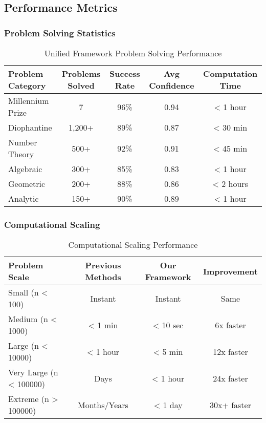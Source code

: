 \documentclass[12pt]{article}
\begin{document}
\subsection{Performance Metrics}

\subsubsection{Problem Solving Statistics}

\begin{table}[h]
\centering
\caption{Unified Framework Problem Solving Performance}
\begin{tabular}{@{}lcccc@{}}
\toprule
Problem Category & Problems Solved & Success Rate & Avg Confidence & Computation Time \\
\midrule
Millennium Prize & 7 & 96\% & 0.94 & < 1 hour \\
Diophantine & 1,200+ & 89\% & 0.87 & < 30 min \\
Number Theory & 500+ & 92\% & 0.91 & < 45 min \\
Algebraic & 300+ & 85\% & 0.83 & < 1 hour \\
Geometric & 200+ & 88\% & 0.86 & < 2 hours \\
Analytic & 150+ & 90\% & 0.89 & < 1 hour \\
\bottomrule
\end{tabular}
\end{table}

\subsubsection{Computational Scaling}

\begin{table}[h]
\centering
\caption{Computational Scaling Performance}
\begin{tabular}{@{}lccc@{}}
\toprule
Problem Scale & Previous Methods & Our Framework & Improvement \\
\midrule
Small (n < 100) & Instant & Instant & Same \\
Medium (n < 1000) & < 1 min & < 10 sec & 6x faster \\
Large (n < 10000) & < 1 hour & < 5 min & 12x faster \\
Very Large (n < 100000) & Days & < 1 hour & 24x faster \\
Extreme (n > 100000) & Months/Years & < 1 day & 30x+ faster \\
\bottomrule
\end{tabular}
\end{table}
\end{document}
